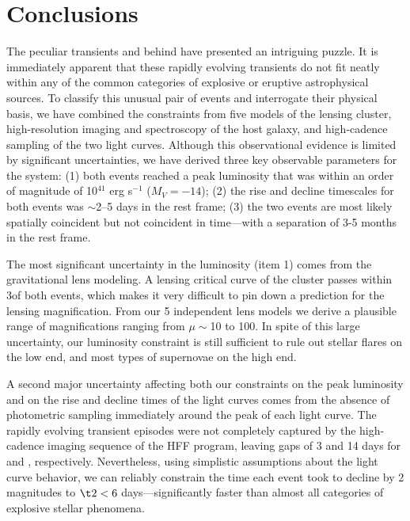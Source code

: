 \section{Conclusions}
\label{sec:Conclusions}

The peculiar transients \spockone and \spocktwo behind  have
presented an intriguing puzzle.  It is immediately apparent that these
rapidly evolving transients do not fit neatly within any of the common
categories of explosive or eruptive astrophysical sources. To classify
this unusual pair of events and interrogate their physical basis, we
have combined the constraints from five models of the lensing cluster,
high-resolution imaging and spectroscopy of the host galaxy, and
high-cadence \HST sampling of the two light curves.  Although this
observational evidence is limited by significant uncertainties, we
have derived three key observable parameters for the \spock system:
(1) both events reached a peak luminosity that was within an order of
magnitude of 10$^{41}$ erg s$^{-1}$ ($M_V=-14$); (2) the rise and
decline timescales for both events was $\sim$2--5 days in the rest
frame; (3) the two events are most likely spatially coincident but not
coincident in time---with a separation of 3-5 months in the rest frame.

The most significant uncertainty in the luminosity (item 1) comes from
the gravitational lens modeling.  A lensing critical curve of the
 cluster passes within 3\arcsec of both \spock events, which
makes it very difficult to pin down a prediction for the lensing
magnification.  From our 5 independent lens models we derive a
plausible range of magnifications ranging from $\mu\sim$10 to 100. In
spite of this large uncertainty, our luminosity constraint is still
sufficient to rule out stellar flares on the low end, and most types
of supernovae on the high end.

A second major uncertainty affecting both our constraints on the peak
luminosity and on the rise and decline times of the light curves comes
from the absence of photometric sampling immediately around the peak
of each light curve.  The rapidly evolving transient episodes were not
completely captured by the high-cadence imaging sequence of the HFF
program, leaving gaps of 3 and 14 days for \spockone and \spocktwo,
respectively.  Nevertheless, using simplistic assumptions about the
light curve behavior, we can reliably constrain the time each event
took to decline by 2 magnitudes to $\t2<6$ days---significantly
faster than almost all categories of explosive stellar phenomena.

